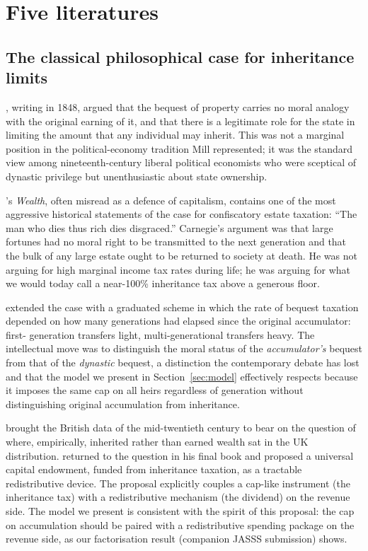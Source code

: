 \documentclass[11pt]{article}
\begin{document}
\section{Five literatures}
\label{sec:literature}

\subsection{The classical philosophical case for inheritance limits}

\citet{mill1848principles}, writing in 1848, argued that the bequest
of property carries no moral analogy with the original earning of it,
and that there is a legitimate role for the state in limiting the
amount that any individual may inherit.  This was not a marginal
position in the political-economy tradition Mill represented; it was
the standard view among nineteenth-century liberal political
economists who were sceptical of dynastic privilege but
unenthusiastic about state ownership.

\citet{carnegie1889wealth}'s \emph{Wealth}, often misread as a
defence of capitalism, contains one of the most aggressive
historical statements of the case for confiscatory estate taxation:
``The man who dies thus rich dies disgraced.''  Carnegie's argument
was that large fortunes had no moral right to be transmitted to the
next generation and that the bulk of any large estate ought to be
returned to society at death.  He was not arguing for high marginal
income tax rates during life; he was arguing for what we would
today call a near-100\% inheritance tax above a generous floor.

\citet{rignano1924bequest} extended the case with a graduated scheme
in which the rate of bequest taxation depended on how many
generations had elapsed since the original accumulator: first-
generation transfers light, multi-generational transfers heavy.
The intellectual move was to distinguish the moral status of the
\emph{accumulator's} bequest from that of the \emph{dynastic}
bequest, a distinction the contemporary debate has lost and that
the model we present in Section~\ref{sec:model} effectively respects
because it imposes the same cap on all heirs regardless of generation
without distinguishing original accumulation from inheritance.

\citet{atkinson1972unequal} brought the British data of the
mid-twentieth century to bear on the question of where, empirically,
inherited rather than earned wealth sat in the UK distribution.
\citet{atkinson2015inequality} returned to the question in his final
book and proposed a universal capital endowment, funded from
inheritance taxation, as a tractable redistributive device.  The
proposal explicitly couples a cap-like instrument (the inheritance
tax) with a redistributive mechanism (the dividend) on the revenue
side.  The model we present is consistent with the spirit of this
proposal: the cap on accumulation should be paired with a
redistributive spending package on the revenue side, as our
factorisation result (companion JASSS submission) shows.
\end{document}
